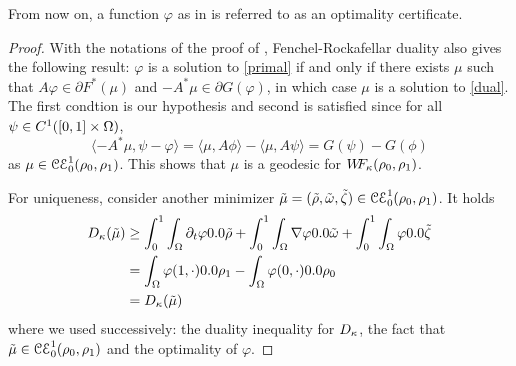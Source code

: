 \begin{definition}
From now on, a function $\varphi$ as in  is referred to as an optimality certificate. 
\end{definition}

\begin{proof}
With the notations of the proof of , Fenchel-Rockafellar duality also gives the following result: $\varphi$ is a solution to \eqref{primal} if and only if  there exists $\mu$ such that $A\varphi \in \partial F^*(\mu)$ and $-A^*\mu \in \partial G(\varphi)$, in which case $\mu$ is a solution to \eqref{dual}. The first condtion is our hypothesis and second is satisfied since for all $\psi \in C^1([0,1] \times \Omega)$,
\[
\langle -A^*\mu, \psi-\varphi \rangle = \langle \mu, A\phi \rangle - \langle \mu, A\psi \rangle = G(\psi)-G(\phi)
\]
as $\mu \in \mathcal{CE}_0^1(\rho_0,\rho_1)$. This shows that $\mu$ is a geodesic for $W\! \! F_{\kappa}(\rho_0,\rho_1)$. 


For uniqueness, consider another minimizer $\tilde{\mu}=(\tilde{\rho},\tilde{\omega}, \tilde{\zeta}) \in \mathcal{CE}_0^1(\rho_0,\rho_1)$. It holds
\begin{align}
\ifonc(\tilde{\mu}) &
\geq \int_0^1 \int_{\Omega} \D_t \varphi \d \tilde{\rho} + \int_0^1 \int_{\Omega} \nabla \varphi \d \tilde{\M} + \int_0^1 \int_{\Omega}  \varphi \d \tilde{\Z} \\
&= \int_{\Omega} \varphi(1,\cdot)\d \rho_1 - \int_{\Omega} \varphi (0,\cdot) \d \rho_0 \\ 
&= \ifonc(\tilde{\mu})
\end{align}
where we used successively: the duality inequality for $D_{\kappa}$, the fact that $\tilde{\mu} \in \mathcal{CE}_0^1(\rho_0,\rho_1)$ and the optimality of $\varphi$. 


\end{proof}
